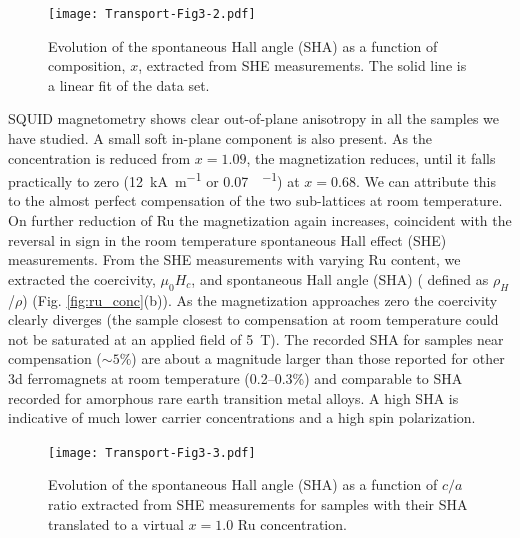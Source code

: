 \documentclass[reprint,aip,apl,floatfix,linenumbers,superscriptaddress]{revtex4-1}
\begin{document}
\begin{figure}
\texttt{[image: Transport-Fig3-2.pdf]}
\caption{Evolution of the spontaneous Hall angle (SHA) as a function of  composition, $x$, extracted from SHE measurements. The solid line is a 
linear fit of the data set.}
\label{fig:SHA}
\end{figure}


SQUID magnetometry shows clear out-of-plane anisotropy in all the samples we have studied.  A small soft in-plane component is also 
present. As the  concentration is reduced from $x=\num{1.09}$, 
the magnetization reduces, until it falls practically to zero (\SI{12}{
\kilo\ampere\per\metre} or \SI{0.07}{\BohrMagneton\per\formulaunit}) at $x=
\num{0.68}$. %
We can attribute this to 
the almost perfect compensation of the two  sub-lattices at room 
temperature. On further reduction of Ru the magnetization again increases, 
coincident with the reversal in sign in the room temperature spontaneous Hall 
effect (SHE) measurements. %
From the SHE measurements with varying Ru content, we extracted the 
coercivity, $\mu_0H_c$, and spontaneous Hall angle (SHA) (
defined as $\rho_H$/$\rho$) (Fig. \ref{fig:ru_conc}(b)). As the magnetization 
approaches zero the coercivity clearly diverges (the sample closest to 
compensation at room temperature could not be saturated at an applied field 
of \SI{5}{\tesla}). The recorded SHA for samples near compensation ($\sim \num
{5}\%$) are about a magnitude larger than those reported for other 3d 
ferromagnets at room temperature (\numrange{0.2}{0.3}\%)\cite{dorleijn1976} 
and comparable to SHA recorded for amorphous rare earth transition metal 
alloys\cite{Kim2001}. A high SHA is indicative of much lower carrier 
concentrations and a high spin polarization.

\begin{figure}
\texttt{[image: Transport-Fig3-3.pdf]}
\caption{Evolution of the spontaneous Hall angle (SHA) as a function of $c/a$ ratio extracted from SHE measurements for samples with their SHA translated to a virtual $x=1.0$ Ru concentration.}
\label{fig:SHA}
\end{figure}
\end{document}
